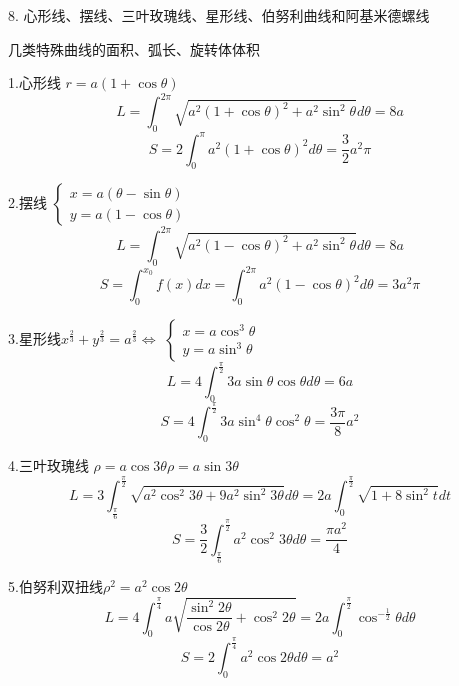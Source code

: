 8. 心形线、摆线、三叶玫瑰线、星形线、伯努利曲线和阿基米德螺线
\begin{definition}\label{def: 常用曲线}
	几类特殊曲线的面积、弧长、旋转体体积
	
	1.心形线 \quad $r=a(1+\cos \theta)$
	$$L=\int_{0}^{2\pi}\sqrt{a^2(1+\cos \theta)^2+a^2\sin^2\theta}d\theta=8a$$
	$$S=2\int_{0}^{\pi}a^2(1+\cos \theta)^2d\theta=\frac{3}{2}a^2\pi$$
	
	2.摆线\quad 
	$\left\lbrace
	\begin{array}{l}
		x=a(\theta-\sin \theta)\\
		y=a(1-\cos \theta)
	\end{array}
	 \right. $
	 $$L=\int_{0}^{2\pi}\sqrt{a^2(1-\cos \theta)^2+a^2\sin^2\theta}d\theta=8a$$
	 $$S=\int_{0}^{x_{0}}f(x)dx=\int_{0}^{2\pi}a^2(1-\cos \theta)^2d\theta=3a^2\pi$$
	
	3.星形线\quad $x^{\frac{2}{3}}+y^{\frac{2}{3}}=a^{\frac{2}{3}}\Leftrightarrow$
	$\left\lbrace
	\begin{array}{l}
		x=a\cos^3\theta\\
		y=a\sin^3\theta
	\end{array}
	 \right. $
	$$L=4\int_{0}^{\frac{\pi}{2}}3a\sin\theta\cos\theta d\theta=6a$$
	$$S=4\int_{0}^{\frac{\pi}{2}}3a\sin^4\theta\cos^2\theta=\frac{3\pi}{8}a^2$$
	
	4.三叶玫瑰线 \quad $\rho=a\cos 3\theta$\quad $\rho=a\sin 3\theta$
	$$L=3\int_{\frac{\pi}{6}}^{\frac{\pi}{2}}\sqrt{a^2\cos^2 3\theta+9a^2\sin^2 3\theta}d\theta=2a\int_{0}^{\frac{\pi}{2}}\sqrt{1+8\sin^2 t}dt$$
	$$S=\frac{3}{2}\int_{\frac{\pi}{6}}^{\frac{\pi}{2}}a^2\cos^2 3\theta d\theta=\frac{\pi a^2}{4}$$
	
	5.伯努利双扭线\quad $\rho^2=a^2\cos 2\theta$
	$$L=4\int_{0}^{\frac{\pi}{4}}a\sqrt{\frac{\sin^2 2\theta}{\cos 2\theta}+\cos^2 2\theta}=2a\int_{0}^{\frac{\pi}{2}}\cos^{-\frac{1}{2}}\theta d\theta$$
	$$S=2\int_{0}^{\frac{\pi}{4}}a^2\cos 2\theta d\theta=a^2$$
\end{definition}
